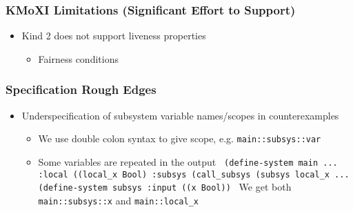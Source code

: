 \documentclass[11pt,xcolor={dvipsnames},hyperref={pdftex,pdfpagemode=UseNone,hidelinks,pdfdisplaydoctitle=true},usepdftitle=false]{beamer}
\newcommand{\code}[1]{{\footnotesize\texttt{#1}}}
\begin{document}
\begin{frame}
    \frametitle{KMoXI Limitations (Significant Effort to Support)}
    \begin{itemize}
        \pause
        \item Kind 2 does not support liveness properties \pause
        \begin{itemize}
        \item Fairness conditions
        \end{itemize}
    \end{itemize}
\end{frame}

\begin{frame}
    \frametitle{Specification Rough Edges}
    \begin{itemize}
        \item Underspecification of subsystem variable names/scopes in counterexamples \pause
        \begin{itemize}
            \item We use double colon syntax to give scope, e.g. \code{main::subsys::var} \pause
            \item Some variables are repeated in the output \pause \newline 
            \code {
                (define-system main ... \newline 
                    \hspace{1cm} :local ((local\_x Bool)  \newline 
                    :subsys (call\_subsys (subsys local\_x ... \newline 
                (define-system subsys \newline
                    :input ((x Bool)) \newline
            } 
            We get both \code{main::subsys::x} and \code{main::local\_x}
        \end{itemize}
    \end{itemize}
\end{frame}
\end{document}
